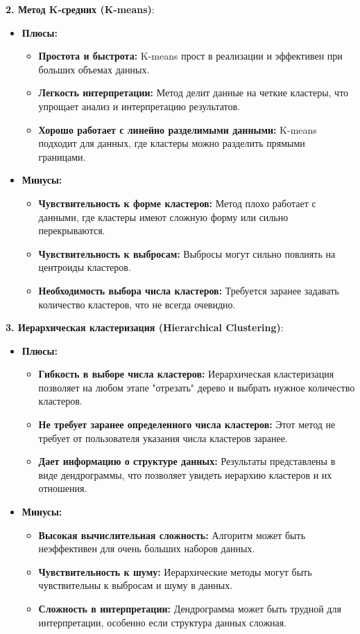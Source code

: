 \begin{itemize}
\textbf{2. Метод K-средних (K-means)}:
\begin{itemize}
    \item \textbf{Плюсы:}
    \begin{itemize}
        \item \textbf{Простота и быстрота:} K-means прост в реализации и эффективен при больших объемах данных.
        \item \textbf{Легкость интерпретации:} Метод делит данные на четкие кластеры, что упрощает анализ и интерпретацию результатов.
        \item \textbf{Хорошо работает с линейно разделимыми данными:} K-means подходит для данных, где кластеры можно разделить прямыми границами.
    \end{itemize}
    \item \textbf{Минусы:}
    \begin{itemize}
        \item \textbf{Чувствительность к форме кластеров:} Метод плохо работает с данными, где кластеры имеют сложную форму или сильно перекрываются.
        \item \textbf{Чувствительность к выбросам:} Выбросы могут сильно повлиять на центроиды кластеров.
        \item \textbf{Необходимость выбора числа кластеров:} Требуется заранее задавать количество кластеров, что не всегда очевидно.
    \end{itemize}
\end{itemize}

\textbf{3. Иерархическая кластеризация (Hierarchical Clustering)}:
\begin{itemize}
    \item \textbf{Плюсы:}
    \begin{itemize}
        \item \textbf{Гибкость в выборе числа кластеров:} Иерархическая кластеризация позволяет на любом этапе "отрезать" дерево и выбрать нужное количество кластеров.
        \item \textbf{Не требует заранее определенного числа кластеров:} Этот метод не требует от пользователя указания числа кластеров заранее.
        \item \textbf{Дает информацию о структуре данных:} Результаты представлены в виде дендрограммы, что позволяет увидеть иерархию кластеров и их отношения.
    \end{itemize}
    \item \textbf{Минусы:}
    \begin{itemize}
        \item \textbf{Высокая вычислительная сложность:} Алгоритм может быть неэффективен для очень больших наборов данных.
        \item \textbf{Чувствительность к шуму:} Иерархические методы могут быть чувствительны к выбросам и шуму в данных.
        \item \textbf{Сложность в интерпретации:} Дендрограмма может быть трудной для интерпретации, особенно если структура данных сложная.
    \end{itemize}
\end{itemize}


\end{itemize}
